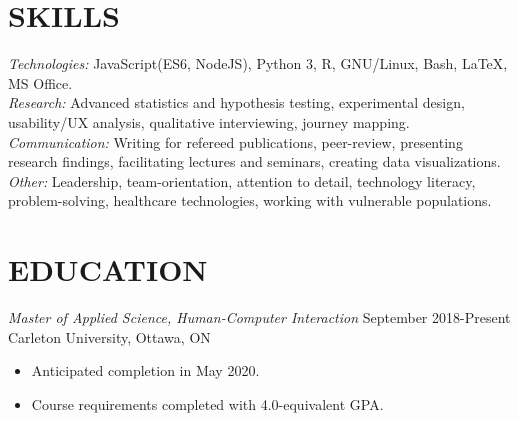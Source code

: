 \documentclass[10pt]{res} %
\begin{document}
\begin{resume}





\section{SKILLS}

{\sl Technologies:} JavaScript(ES6, NodeJS), Python 3, R, GNU/Linux, Bash,
\LaTeX, MS Office.
\vspace{2mm}\\
{\sl Research:} Advanced statistics and hypothesis testing, experimental design,
usability/UX analysis, qualitative interviewing, journey mapping.
\vspace{2mm}\\
{\sl Communication:} Writing for refereed publications, peer-review, presenting research findings, facilitating lectures and seminars, creating data visualizations.
\vspace{2mm}\\
{\sl Other:} Leadership, team-orientation, attention to detail, technology literacy, problem-solving, healthcare technologies, working with vulnerable populations.


\section{EDUCATION}
{\sl Master of Applied Science, Human-Computer Interaction} \hfill September 2018-Present\newline
Carleton University, Ottawa, ON
\begin{itemize}
    \item Anticipated completion in May 2020.
    \item Course requirements completed with 4.0-equivalent GPA.
\end{itemize}{}


\end{resume}
\end{document}

